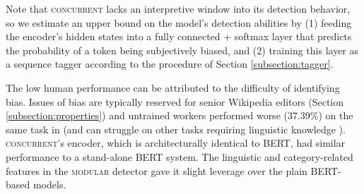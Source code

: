 Note that \textsc{concurrent} lacks an interpretive window into its detection behavior, so we estimate an upper bound on the model's detection abilities by (1) feeding the encoder's hidden states into a fully connected + softmax layer that predicts the probability of a token being subjectively biased, and (2) training this layer as a sequence tagger according to the procedure of Section \ref{subsection:tagger}. 

The low human performance can be attributed to the difficulty of identifying bias. Issues of bias are typically reserved for senior Wikipedia editors (Section \ref{subsection:properties}) and untrained workers performed worse (37.39\%) on the same task in \cite{recasens2013linguistic} (and can struggle on other tasks requiring linguistic knowledge \cite{callison2009fast}). \textsc{concurrent}'s encoder, which is architecturally identical to BERT, had similar performance to a stand-alone BERT system. The linguistic and category-related features in the \textsc{modular} detector gave it slight leverage over the plain BERT-based models. 






